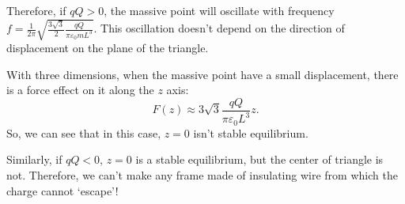 \documentclass[12pt]{article}
\begin{document}
\noindent Therefore, if $qQ>0$, the massive point will oscillate with frequency $f= \frac{1}{2\pi} \sqrt{ \frac{3\sqrt{3}}{2} \frac{qQ}{\pi \varepsilon_0 m L^3} }$. This oscillation doesn't depend on the direction of displacement on the plane of the triangle.

\noindent With three dimensions, when the massive point have a small displacement, there is a force effect on it along the $z$ axis:
$$F(z) \approx 3 \sqrt{3} \frac{qQ}{\pi \varepsilon_0 L^3} z.$$
\noindent So, we can see that in this case, $z=0$ isn't stable equilibrium.

\noindent Similarly, if $qQ<0$, $z=0$ is a stable equilibrium, but the center of triangle is not. Therefore, we can't make any frame made of insulating wire from which the charge cannot ‘escape’!
\end{document}
